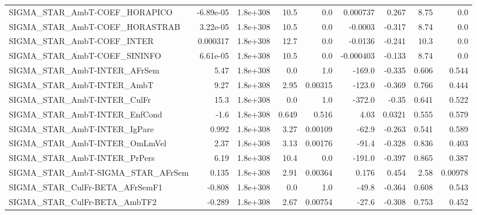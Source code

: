\begin{tabular}{lrrrrrrrr}
SIGMA\_STAR\_AmbT-COEF\_HORAPICO         &   -6.89e-05 &     1.8e+308 &    10.5 &      0.0 &   0.000737 &       0.267 &         8.75 &           0.0 \\
SIGMA\_STAR\_AmbT-COEF\_HORASTRAB        &    3.22e-05 &     1.8e+308 &    10.5 &      0.0 &    -0.0003 &      -0.317 &         8.74 &           0.0 \\
SIGMA\_STAR\_AmbT-COEF\_INTER            &    0.000317 &     1.8e+308 &    12.7 &      0.0 &    -0.0136 &      -0.241 &         10.3 &           0.0 \\
SIGMA\_STAR\_AmbT-COEF\_SININFO          &    6.61e-05 &     1.8e+308 &    10.5 &      0.0 &  -0.000403 &      -0.133 &         8.74 &           0.0 \\
SIGMA\_STAR\_AmbT-INTER\_AFrSem          &        5.47 &     1.8e+308 &     0.0 &      1.0 &     -169.0 &      -0.335 &        0.606 &         0.544 \\
SIGMA\_STAR\_AmbT-INTER\_AmbT            &        9.27 &     1.8e+308 &    2.95 &  0.00315 &     -123.0 &      -0.369 &        0.766 &         0.444 \\
SIGMA\_STAR\_AmbT-INTER\_CulFr           &        15.3 &     1.8e+308 &     0.0 &      1.0 &     -372.0 &       -0.35 &        0.641 &         0.522 \\
SIGMA\_STAR\_AmbT-INTER\_EnfCond         &        -1.6 &     1.8e+308 &   0.649 &    0.516 &       4.03 &      0.0321 &        0.555 &         0.579 \\
SIGMA\_STAR\_AmbT-INTER\_IgPare          &       0.992 &     1.8e+308 &    3.27 &  0.00109 &      -62.9 &      -0.263 &        0.541 &         0.589 \\
SIGMA\_STAR\_AmbT-INTER\_OmLmVel         &        2.37 &     1.8e+308 &    3.13 &  0.00176 &      -91.4 &      -0.328 &        0.836 &         0.403 \\
SIGMA\_STAR\_AmbT-INTER\_PrPers          &        6.19 &     1.8e+308 &    10.4 &      0.0 &     -191.0 &      -0.397 &        0.865 &         0.387 \\
SIGMA\_STAR\_AmbT-SIGMA\_STAR\_AFrSem     &       0.135 &     1.8e+308 &    2.91 &  0.00364 &      0.176 &       0.454 &         2.58 &       0.00978 \\
SIGMA\_STAR\_CulFr-BETA\_AFrSemF1        &      -0.808 &     1.8e+308 &     0.0 &      1.0 &      -49.8 &      -0.364 &        0.608 &         0.543 \\
SIGMA\_STAR\_CulFr-BETA\_AmbTF2          &      -0.289 &     1.8e+308 &    2.67 &  0.00754 &      -27.6 &      -0.308 &        0.753 &         0.452 \\

\end{tabular}
